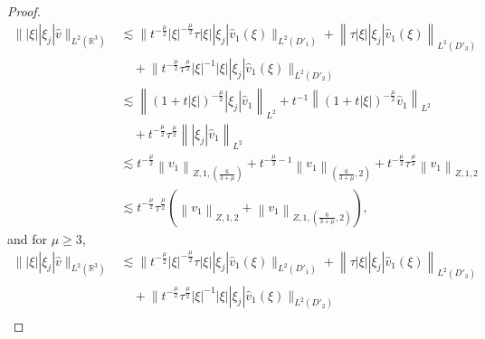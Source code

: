 \documentclass[11pt,twoside]{article}
\newcommand{\R}{\mathbb R}
\newcommand{\f}{\frac}
\theoremstyle{plain}
\theoremstyle{definition}
\theoremstyle{remark}
\numberwithin{equation}{section}
\begin{document}
\begin{proof}
\begin{equation}\label{l23'}
\begin{aligned}
\||\xi||\xi_j|\hat{v}\|_{L^2(\R^3)}& \lesssim\big\|t^{-\frac{\mu}{2}} |\xi|^{-\frac{\mu}{2}}\tau|\xi||\xi_j| \hat{v}_1(\xi)\big\|_{L^2(D'_1)}+\left\|\tau|\xi||\xi_j| \hat{v}_1(\xi)\right\|_{L^2(D'_3)}\\
&\quad +\big\|t^{-\frac{\mu}{2}}\tau^{\frac{\mu}{2}} |\xi|^{-1}|\xi||\xi_j| \hat{v}_1(\xi)\big\|_{L^2(D'_2)} \\
& \lesssim \left\|(1+t|\xi|)^{-\f{\mu}{2}}|\xi_j| \hat{v}_1\right\|_{L^2}+t^{-1}\left\|(1+t|\xi|)^{-\f{\mu}{2}} \hat{v}_1\right\|_{L^2}\\
&\quad +t^{-\frac{\mu}{2}} \tau^{\frac{\mu}{2}} \left\||\xi_j|\hat{v}_1\right\|_{L^2} \\
& \lesssim t^{-\f{\mu}{2}} \left\|v_1\right\|_{Z, 1, (\f{6}{3+\mu})}+ t^{-\f{\mu}{2}-1}\left\|v_1\right\|_{(\f{6}{3+\mu}, 2)}+t^{-\f{\mu}{2}} \tau^{\f{\mu}{2}}\left\|v_1\right\|_{Z, 1, 2} \\
& \lesssim t^{-\f{\mu}{2}}\tau^{\f{\mu}{2}}(\left\|v_1\right\|_{Z, 1,2}+\left\|v_1\right\|_{Z, 1,(\f{6}{3+\mu}, 2)}),
\end{aligned}
\end{equation}
and for $\mu\geq3$,
\begin{equation*}\label{l23}
\begin{aligned}
\||\xi||\xi_j|\hat{v}\|_{L^2(\R^3)}& \lesssim\big\|t^{-\frac{\mu}{2}} |\xi|^{-\frac{\mu}{2}}\tau|\xi||\xi_j| \hat{v}_1(\xi)\big\|_{L^2(D'_1)}+\left\|\tau|\xi||\xi_j| \hat{v}_1(\xi)\right\|_{L^2(D'_3)}\\
&\quad +\big\|t^{-\frac{\mu}{2}}\tau^{\frac{\mu}{2}} |\xi|^{-1}|\xi||\xi_j| \hat{v}_1(\xi)\big\|_{L^2(D'_2)} \\
\end{aligned}
\end{equation*}


\end{proof}
\end{document}
